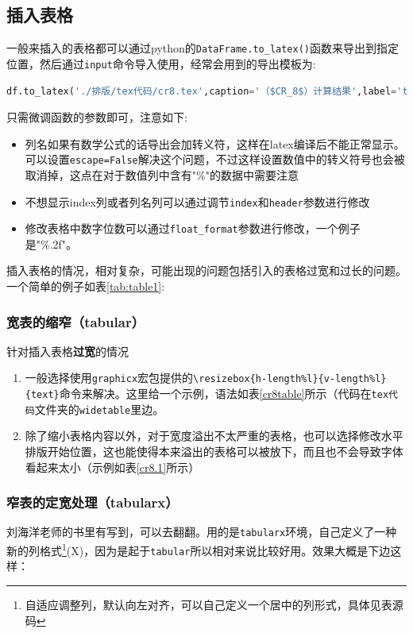 \documentclass[withoutpreface,bwprint]{../cumcmthesis} %
\begin{document}
\subsection{插入表格}
一般来插入的表格都可以通过python的\verb|DataFrame.to_latex()|函数来导出到指定位置，然后通过\verb|input|命令导入使用，经常会用到的导出模板为:
\begin{lstlisting}[language=python]
df.to_latex('./排版/tex代码/cr8.tex',caption='（$CR_8$）计算结果',label='table',header=False)
\end{lstlisting}
只需微调函数的参数即可，注意如下:
\begin{itemize}
  \item 列名如果有数学公式的话导出会加转义符，这样在latex编译后不能正常显示。可以设置\verb|escape=False|解决这个问题，不过这样设置数值中的转义符号也会被取消掉，这点在对于数值列中含有"\%"的数据中需要注意
  \item 不想显示index列或者列名列可以通过调节\verb|index|和\verb|header|参数进行修改
  \item 修改表格中数字位数可以通过\verb|float_format|参数进行修改，一个例子是"\%.2f"。
\end{itemize}

插入表格的情况，相对复杂，可能出现的问题包括引入的表格过宽和过长的问题。
一个简单的例子如表\ref{tab:table1}:
{}
\subsubsection{宽表的缩窄（tabular）}
针对插入表格\textbf{过宽}的情况
\begin{enumerate}
  \item 一般选择使用\verb|graphicx|宏包提供的\verb|\resizebox{h-length%l}{v-length%l}{text}|命令来解决。这里给一个示例，语法如表\ref{cr8table}所示（代码在\verb|tex代码|文件夹的\verb|widetable|里边。
        {
        
        }
  \item 除了缩小表格内容以外，对于宽度溢出不太严重的表格，也可以选择修改水平排版开始位置，这也能使得本来溢出的表格可以被放下，而且也不会导致字体看起来太小（示例如表\ref{cr8.1}所示）
        {
        
        }
\end{enumerate}

\subsubsection{窄表的定宽处理（tabularx）}
刘海洋老师的书里有写到，可以去翻翻。用的是\verb|tabularx|环境，自己定义了一种新的列格式\footnote{自适应调整列，默认向左对齐，可以自己定义一个居中的列形式，具体见表源码}(X)，因为是起于\verb|tabular|所以相对来说比较好用。效果大概是下边这样：

\end{document}
